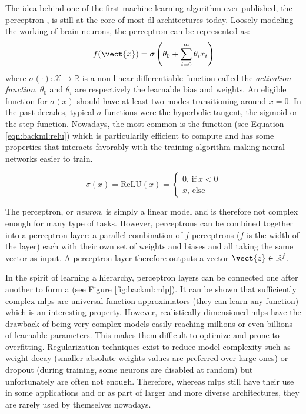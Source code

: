 The idea behind one of the first machine learning algorithm ever published, the perceptron \parencite{rosenblatt1958perceptron}, is still at the core of most \acrlong{dl} architectures today. Loosely modeling the working of brain neurons, the perceptron can be represented as: 
\begin{equation}
\label{eqn:backml:perceptron}
f(\vect{x}) = \sigma\left(\theta_0 + \sum_{i=0}^m \theta_i x_i\right)
\end{equation}
where $\sigma(\cdot): \mathcal{X} \rightarrow \mathbb{R}$ is a non-linear differentiable function called the \textit{activation function}, $\theta_0$ and $\theta_i$ are respectively the learnable bias and weights. An eligible function for $\sigma(x)$ should have at least two modes transitioning around $x=0$. In the past decades, typical $\sigma$ functions were the hyperbolic tangent, the sigmoid or the step function. Nowadays, the most common is the  function (see Equation \ref{eqn:backml:relu}) which is particularily efficient to compute and has some properties that interacts favorably with the training algorithm making neural networks easier to train.

\begin{equation}
\label{eqn:backml:relu}
\sigma(x) = \text{ReLU}(x) = \begin{cases}
0\text{, if}~ x < 0\\
x\text{, else}
\end{cases}
\end{equation}

The perceptron, or \textit{neuron}, is simply a linear model and is therefore not complex enough for many type of tasks. However, perceptrons can be combined together into a perceptron layer: a parallel combination of $f$ perceptrons ($f$ is the width of the layer) each with their own set of weights and biases and all taking the same vector as input. A perceptron layer therefore outputs a vector $\vect{z} \in \mathbb{R}^f$. 

In the spirit of learning a hierarchy, perceptron layers can be connected one after another to form a  (see Figure \ref{fig:backml:mlp}). It can be shown that sufficiently complex \acrshort{mlp}s are universal function approximators (\ie they can learn any function) \parencite{hornik1989multilayer} which is an interesting property. However, realistically dimensioned \acrshort{mlp}s have the drawback of being very complex models easily reaching millions or even billions of learnable parameters. This makes them difficult to optimize and prone to overfitting. Regularization techniques exist to reduce model complexity such as weight decay (\ie smaller absolute weights values are preferred over large ones) or dropout \parencite{srivastava2014dropout} (\ie during training, some neurons are disabled at random) but unfortunately are often not enough. Therefore, whereas \acrshort{mlp}s still have their use in some applications and or as part of larger and more diverse architectures, they are rarely used by themselves nowadays.

